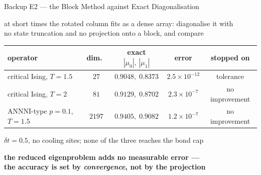 \documentclass[aspectratio=169,11pt]{beamer}
\newcommand{\idea}[1]{\begin{center}\color{accent!80!black}\textbf{#1}\end{center}}
\begin{document}
\begin{frame}{Backup E2 --- the Block Method against Exact Diagonalisation}
  \vfill
  \begin{center}\small
    at short times the rotated column fits as a dense array: diagonalise
    it with\\ no state truncation and no projection onto a block, and compare
  \end{center}
  \vfill
  {\centering\small
    \setlength{\tabcolsep}{7pt}\renewcommand{\arraystretch}{1.2}%
    \begin{tabular}{@{}lcccc@{}}
      \toprule
      operator                    & dim.\  & exact $|\mu_0|,\,|\mu_1|$ & error               & stopped on     \\
      \midrule
      critical Ising, $T=1.5$     & $27$   & $0.9048,\;0.8373$         & $2.5\times10^{-12}$ & tolerance      \\
      critical Ising, $T=2$       & $81$   & $0.9129,\;0.8702$         & $2.3\times10^{-7}$  & no improvement \\
      ANNNI-type $p=0.1$, $T=1.5$ & $2197$ & $0.9405,\;0.9082$         & $1.2\times10^{-7}$  & no improvement \\
      \bottomrule
    \end{tabular}\par}
  \vspace{0.3em}
  \begin{center}\footnotesize\color{ink!70}
    $\delta t = 0.5$, no cooling sites; none of the three reaches the bond cap
  \end{center}
  \vfill
  \idea{the reduced eigenproblem adds no measurable error ---\\
    the accuracy is set by \emph{convergence}, not by the projection}
  \vfill
\end{frame}

\end{document}

